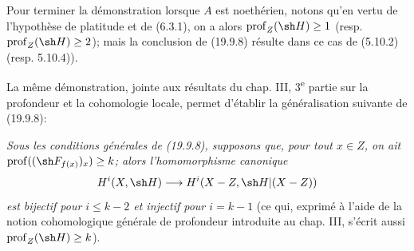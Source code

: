 Pour terminer la démonstration lorsque $A$ est noethérien, notons qu'en vertu de l'hypothèse de platitude et de (6.3.1), on a alors $\operatorname{prof}_Z(\sh H)\geq1$ (resp. $\operatorname{prof}_Z(\sh H)\geq2$); mais la conclusion de (19.9.8) résulte dans ce cas de (5.10.2) (resp. 5.10.4)).

\begin{remark}[19.9.9]
\label{IV.19.9.9}
La même démonstration, jointe aux résultats du chap. III, 3\textsuperscript{e} partie sur la profondeur et la cohomologie locale, permet d'établir la généralisation suivante de (19.9.8):

\emph{Sous les conditions générales de (19.9.8), supposons que, pour tout $x\in Z$, on ait $\operatorname{prof}((\sh F_{f(x)})_x)\geq k$; alors l'homomorphisme canonique}
\[
  H^i(X,\sh H)\longrightarrow H^i(X-Z,\sh H|(X-Z))
\]
\emph{est bijectif pour $i\leq k-2$ et injectif pour $i=k-1$} (ce qui, exprimé à l'aide de la notion cohomologique générale de profondeur introduite au chap. III, s'écrit aussi $\operatorname{prof}_Z(\sh H)\geq k$).
\end{remark}
